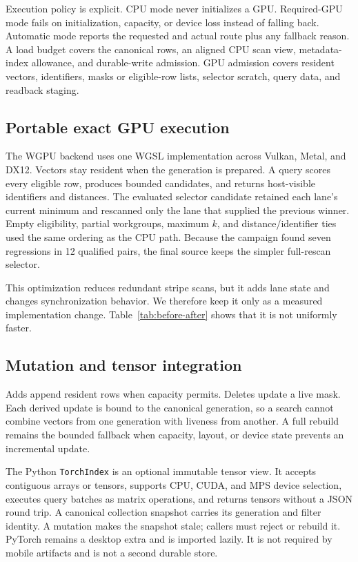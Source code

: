 \documentclass[10pt]{article}
\begin{document}
Execution policy is explicit. CPU mode never initializes a GPU. Required-GPU mode fails on initialization, capacity, or device loss instead of falling back. Automatic mode reports the requested and actual route plus any fallback reason. A load budget covers the canonical rows, an aligned CPU scan view, metadata-index allowance, and durable-write admission. GPU admission covers resident vectors, identifiers, masks or eligible-row lists, selector scratch, query data, and readback staging.

\subsection{Portable exact GPU execution}
The WGPU backend uses one WGSL implementation across Vulkan, Metal, and DX12. Vectors stay resident when the generation is prepared. A query scores every eligible row, produces bounded candidates, and returns host-visible identifiers and distances. The evaluated selector candidate retained each lane's current minimum and rescanned only the lane that supplied the previous winner. Empty eligibility, partial workgroups, maximum \(k\), and distance/identifier ties used the same ordering as the CPU path. Because the campaign found seven regressions in 12 qualified pairs, the final source keeps the simpler full-rescan selector.

This optimization reduces redundant stripe scans, but it adds lane state and changes synchronization behavior. We therefore keep it only as a measured implementation change. Table~\ref{tab:before-after} shows that it is not uniformly faster.

\subsection{Mutation and tensor integration}
Adds append resident rows when capacity permits. Deletes update a live mask. Each derived update is bound to the canonical generation, so a search cannot combine vectors from one generation with liveness from another. A full rebuild remains the bounded fallback when capacity, layout, or device state prevents an incremental update.

The Python \texttt{TorchIndex} is an optional immutable tensor view. It accepts contiguous arrays or tensors, supports CPU, CUDA, and MPS device selection, executes query batches as matrix operations, and returns tensors without a JSON round trip. A canonical collection snapshot carries its generation and filter identity. A mutation makes the snapshot stale; callers must reject or rebuild it. PyTorch remains a desktop extra and is imported lazily. It is not required by mobile artifacts and is not a second durable store.
\end{document}
